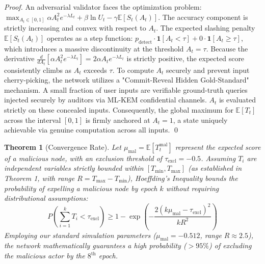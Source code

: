 \documentclass[journal]{IEEEtran}
\newtheorem{theorem}{Theorem}
\begin{document}
\begin{proof}
An adversarial validator faces the optimization problem: $\max_{A_t \in [0,1]} \alpha A_t^2 e^{-\lambda L_t} + \beta \ln U_t - \gamma \mathbb{E}[S_t(A_t)]$. The accuracy component is strictly increasing and convex with respect to $A_t$. The expected slashing penalty $\mathbb{E}[S_t(A_t)]$ operates as a step function: $p_{\text{detect}} \cdot \mathbf{1}[A_t < \tau] + 0 \cdot \mathbf{1}[A_t \geq \tau]$, which introduces a massive discontinuity at the threshold $A_t = \tau$. Because the derivative $\frac{d}{dA_t}[\alpha A_t^2 e^{-\lambda L_t}] = 2\alpha A_t e^{-\lambda L_t}$ is strictly positive, the expected score consistently climbs as $A_t$ exceeds $\tau$. To compute $A_t$ securely and prevent input cherry-picking, the network utilizes a "Commit-Reveal Hidden Gold-Standard" mechanism. A small fraction of user inputs are verifiable ground-truth queries injected securely by auditors via ML-KEM confidential channels. $A_t$ is evaluated strictly on these concealed inputs. Consequently, the global maximum for $\mathbb{E}[T_t]$ across the interval $[0,1]$ is firmly anchored at $A_t = 1$, a state uniquely achievable via genuine computation across all inputs. \qed
\end{proof}

\begin{theorem}[Convergence Rate]
\label{thm:convergence}
Let $\mu_{\text{mal}} = \mathbb{E}[T_t^{\text{mal}}]$ represent the expected score of a malicious node, with an exclusion threshold of $\tau_{\text{excl}} = -0.5$. Assuming $T_i$ are independent variables strictly bounded within $[T_{\min}, T_{\max}]$ (as established in Theorem 1, with range $R = T_{\max} - T_{\min}$), Hoeffding's Inequality bounds the probability of expelling a malicious node by epoch $k$ without requiring distributional assumptions:
\begin{equation}
  P\!\left(\sum_{i=1}^k T_i < \tau_{\text{excl}}\right) \geq
  1 - \exp\!\left(-\frac{2 (k\mu_{\text{mal}} - \tau_{\text{excl}})^2}{k R^2}\right)
\end{equation}
Employing our standard simulation parameters ($\mu_{\text{mal}} = -0.512$, range $R \approx 2.5$), the network mathematically guarantees a high probability ($>95\%$) of excluding the malicious actor by the $8^{\text{th}}$ epoch.
\end{theorem}
\end{document}

